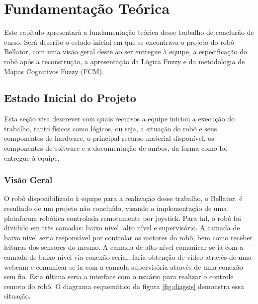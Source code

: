 \chapter{Fundamentação Teórica}

Este capítulo apresentará a fundamentação teórica desse trabalho de conclusão de curso. Será descrito o estado inicial em que se encontrava o projeto do robô Bellator, com uma visão geral deste ao ser entregue à equipe, a especificação do robô após a reconstrução, a apresentação da Lógica Fuzzy e da metodologia de Mapas Cognitivos Fuzzy (FCM).

\section{Estado Inicial do Projeto}
\label{chap:estpro}

Esta seção visa descrever com quais recursos a equipe iniciou a execução do trabalho, tanto físicos como lógicos, ou seja, a situação do robô e seus componentes de hardware, o principal recurso material disponível, os componentes de software e a documentação de ambos, da forma como foi entregue à equipe.

\subsection{Visão Geral}

O robô disponibilizado à equipe para a realização desse trabalho, o Bellator, é resultado de um projeto não concluído, visando a implementação de uma plataforma robótica controlada remotamente por joystick. Para tal, o robô foi dividido em três camadas: baixo nível, alto nível e supervisório. A camada de baixo nível seria responsável por controlar os motores do robô, bem como receber leituras dos sensores do mesmo. A camada de alto nível comunicar-se-ia com a camada de baixo nível via conexão serial, faria obtenção de vídeo através de uma webcam e comunicar-se-ia com a camada supervisória através de uma conexão sem fio. Esta última seria a interface com o usuário para realizar o controle remoto do robô. O diagrama esquemático da figura \ref{fig:diagsis} demonstra essa situação.

